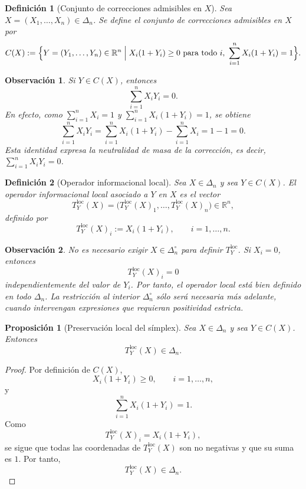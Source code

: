 ﻿\documentclass[12pt]{article}
\newtheorem{definicion}{Definición}[section]
\newtheorem{proposicion}{Proposición}[section]
\newtheorem{observacion}{Observación}[section]
\begin{document}
\begin{definicion}[Conjunto de correcciones admisibles en $X$]\label{def:CX}
Sea $X=(X_1,\dots,X_n)\in\Delta_n$. Se define el \emph{conjunto de correcciones admisibles en $X$} por
\[
C(X)
:=
\Bigl\{
Y=(Y_1,\dots,Y_n)\in\mathbb{R}^n
\;\Big|\;
X_i(1+Y_i)\ge 0\ \text{para todo } i,
\ \sum_{i=1}^n X_i(1+Y_i)=1
\Bigr\}.
\]
\end{definicion}

\begin{observacion}\label{obs:neutralidad}
Si $Y\in C(X)$, entonces
\[
\sum_{i=1}^n X_iY_i=0.
\]
En efecto, como $\sum_{i=1}^n X_i=1$ y $\sum_{i=1}^n X_i(1+Y_i)=1$, se obtiene
\[
\sum_{i=1}^n X_iY_i
=
\sum_{i=1}^n X_i(1+Y_i)-\sum_{i=1}^n X_i
=
1-1
=
0.
\]
Esta identidad expresa la neutralidad de masa de la corrección, es decir, $\sum_{i=1}^n X_iY_i=0$.
\end{observacion}

\begin{definicion}[Operador informacional local]\label{def:Tloc}
Sea $X\in\Delta_n$ y sea $Y\in C(X)$. El \emph{operador informacional local} asociado a $Y$ en $X$ es el vector
\[
T_Y^{\mathrm{loc}}(X)
=
\bigl(T_Y^{\mathrm{loc}}(X)_1,\dots,T_Y^{\mathrm{loc}}(X)_n\bigr)\in\mathbb{R}^n,
\]
definido por
\[
T_Y^{\mathrm{loc}}(X)_i:=X_i(1+Y_i),\qquad i=1,\dots,n.
\]
\end{definicion}

\begin{observacion}\label{obs:frontera}
No es necesario exigir $X\in\Delta_n^\circ$ para definir $T_Y^{\mathrm{loc}}$. Si $X_i=0$, entonces
\[
T_Y^{\mathrm{loc}}(X)_i=0
\]
independientemente del valor de $Y_i$. Por tanto, el operador local está bien definido en todo $\Delta_n$. La restricción al interior $\Delta_n^\circ$ sólo será necesaria más adelante, cuando intervengan expresiones que requieran positividad estricta.
\end{observacion}

\begin{proposicion}[Preservación local del símplex]\label{prop:preservacionLocal}
Sea $X\in\Delta_n$ y sea $Y\in C(X)$. Entonces
\[
T_Y^{\mathrm{loc}}(X)\in\Delta_n.
\]
\end{proposicion}

\begin{proof}
Por definición de $C(X)$,
\[
X_i(1+Y_i)\ge 0,\qquad i=1,\dots,n,
\]
y
\[
\sum_{i=1}^n X_i(1+Y_i)=1.
\]
Como
\[
T_Y^{\mathrm{loc}}(X)_i=X_i(1+Y_i),
\]
se sigue que todas las coordenadas de $T_Y^{\mathrm{loc}}(X)$ son no negativas y que su suma es $1$. Por tanto,
\[
T_Y^{\mathrm{loc}}(X)\in\Delta_n.
\]
\end{proof}
\end{document}
